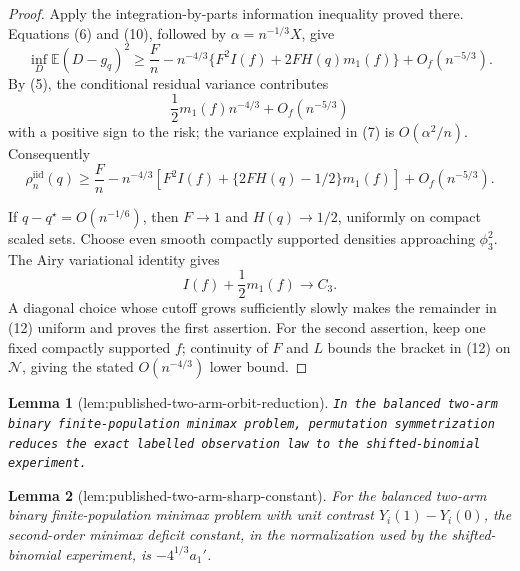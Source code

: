 \documentclass{article}
\newtheorem{lemma}{Lemma}
\begin{document}
\begin{proof}
Apply the integration-by-parts information inequality proved there.  Equations (6) and (10), followed by \(\alpha=n^{-1/3}X\), give
\[
\inf_D\mathbb E(D-g_q)^2
\geq
\frac Fn-n^{-4/3}
\{F^2I(f)+2FH(q)m_1(f)\}+O_f(n^{-5/3}).
\tag{11}
\]
By (5), the conditional residual variance contributes
\[
\frac12m_1(f)n^{-4/3}+O_f(n^{-5/3})
\]
with a positive sign to the risk; the variance explained in (7) is \(O(\alpha^2/n)\).  Consequently
\[
\rho_n^{\mathrm{iid}}(q)
\geq \frac Fn-n^{-4/3}
\left[F^2I(f)+\{2FH(q)-1/2\}m_1(f)\right]
+O_f(n^{-5/3}).
\tag{12}
\]

If \(q-q^\star=O(n^{-1/6})\), then \(F\to1\) and \(H(q)\to1/2\), uniformly on compact scaled sets.  Choose even smooth compactly supported densities approaching \(\phi_3^2\).  The Airy variational identity gives
\[
I(f)+\frac12m_1(f)\longrightarrow C_3.
\]
A diagonal choice whose cutoff grows sufficiently slowly makes the remainder in (12) uniform and proves the first assertion.  For the second assertion, keep one fixed compactly supported \(f\); continuity of \(F\) and \(L\) bounds the bracket in (12) on \(\mathcal N\), giving the stated \(O(n^{-4/3})\) lower bound.
\end{proof}

\begin{lemma}[lem:published-two-arm-orbit-reduction]\label{lem:published-two-arm-orbit-reduction}
\texttt{In the balanced two-\allowbreak{}arm binary finite-\allowbreak{}population minimax problem,\allowbreak{} permutation symmetrization reduces the exact labelled observation law to the shifted-\allowbreak{}binomial experiment.}
\end{lemma}

\begin{lemma}[lem:published-two-arm-sharp-constant]\label{lem:published-two-arm-sharp-constant}
For the balanced two-arm binary finite-population minimax problem with unit contrast \(Y_i(1)-Y_i(0)\), the second-order minimax deficit constant, in the normalization used by the shifted-binomial experiment, is \(-4^{1/3}a_1'\).
\end{lemma}
\end{document}
